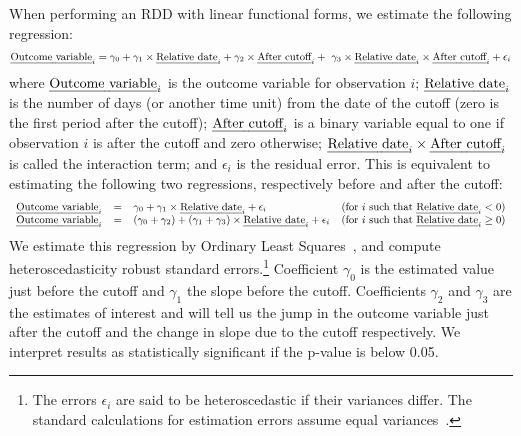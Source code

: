 When performing an RDD with linear functional forms, we estimate the following regression:  
\begin{equation*}
\small
\arraycolsep=0pt
\begin{array}{l}
\mbox{\emph{Outcome variable}}_i = 
\gamma_0 +\gamma_1 \times \mbox{\emph{Relative date}}_i
+ \gamma_2 \times \mbox{\emph{After cutoff}}_i 
+~\gamma_3 \times \mbox{\emph{Relative date}}_i \times \mbox{\emph{After cutoff}}_i
+ \epsilon_i
\end{array}
\end{equation*}
\noindent where $\mbox{\emph{Outcome variable}}_i$ is the outcome variable for observation $i$; $\mbox{\emph{Relative date}}_i$ is the number of days (or another time unit) from the date of the cutoff (zero is the first period after the cutoff); $\mbox{\emph{After cutoff}}_i$ is a binary variable equal to one if observation $i$ is after the cutoff and zero otherwise; $\mbox{\emph{Relative date}}_i \times \mbox{\emph{After cutoff}}_i$ is called the interaction term; and $\epsilon_i$ is the residual error. This is equivalent to estimating the following two regressions, respectively before and after the cutoff:
\begin{equation*}
\small
\begin{array}{llll}
\mbox{\emph{Outcome variable}}_i & = &  \gamma_0 + \gamma_1 \times \mbox{\emph{Relative date}}_i + \epsilon_i &
\text{(for $i$ such that $\mbox{\emph{Relative date}}_i < 0$)} \\
\mbox{\emph{Outcome variable}}_i & = &  (\gamma_0 + \gamma_2) + (\gamma_1 + \gamma_3) \times \mbox{\emph{Relative date}}_i + \epsilon_i &
\text{(for $i$ such that $\mbox{\emph{Relative date}}_i \geq 0$)} \\
\end{array}
\end{equation*}
We estimate this regression by Ordinary Least Squares~\cite{wooldridge2015introductory}, and compute heteroscedasticity robust standard errors.\footnote{
	The errors $\epsilon_i$ are said to be heteroscedastic if their variances differ.
	The standard calculations for estimation errors assume equal variances~\cite{wooldridge2015introductory}.
}
Coefficient $\gamma_0$ is the estimated value just before the cutoff and $\gamma_1$ the slope before the cutoff. Coefficients $\gamma_2$ and $\gamma_3$ are the estimates of interest and will tell us the jump in the outcome variable just after the cutoff and the change in slope due to the cutoff respectively.
We interpret results as statistically significant if the p-value is below 0.05.

